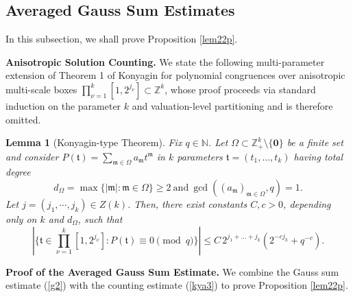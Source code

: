 \documentclass[10pt,a4paper]{amsart}
\newtheorem{lemma}{Lemma}\numberwithin{lemma}{section}
\numberwithin{equation}{section}
\begin{document}
\subsection{Averaged Gauss Sum Estimates} \label{ag}
In this subsection, we shall prove Proposition \ref{lem22p}.

\noindent\textbf{Anisotropic Solution Counting.}
We state the following multi-parameter extension of   Theorem 1 of Konyagin \cite{Kon} for polynomial congruences over
anisotropic multi-scale boxes
$
\prod_{\nu=1}^k [1,2^{j_\nu}] \subset \mathbb{Z}^k
$,
whose proof proceeds via standard induction on the parameter $k$ and valuation-level partitioning and is therefore omitted.  
\begin{lemma}[Konyagin-type Theorem]\label{mkl1}
Fix $q\in \mathbb{N}$.	Let $\Omega \subset \mathbb{Z}_+^k \setminus \{\mathbf{0}\}$ be a finite set  and consider $P(\mathfrak{t})=\sum_{\mathfrak{m}\in \Omega} a_{\mathfrak{m}}t^{\mathfrak{m}}$ in $k$ parameters $\mathfrak{t} = (t_1, \dots, t_k)$ having total degree $$d_{\Omega} = \max\{|\mathfrak{m}| : \mathfrak{m} \in \Omega\}\ge 2\  \text{and}\ \gcd((a_{\mathfrak{m}})_{\mathfrak{m} \in \Omega}, q) = 1.$$
	Let $j=(j_1,\cdots,j_{k})\in Z(k)$.  Then, there exist  constants $C, c>0$, depending only on $k$ and $d_{\Omega}$, such that
	\begin{equation}\label{kya3}
		|\{ \mathfrak{t} \in  \prod_{\nu=1}^k [1, 2^{j_\nu}]: P(\mathfrak{t}) \equiv 0 \pmod q \}| \le C \, 2^{j_1 + \dots + j_k} (2^{-cj_k}+q^{-c}).
	\end{equation}
\end{lemma} 


 






\noindent \textbf{Proof of the Averaged  Gauss Sum Estimate.} 
We combine the Gauss sum estimate (\ref{g2}) with the counting estimate (\ref{kya3}) to prove Proposition \ref{lem22p}.
\end{document}
